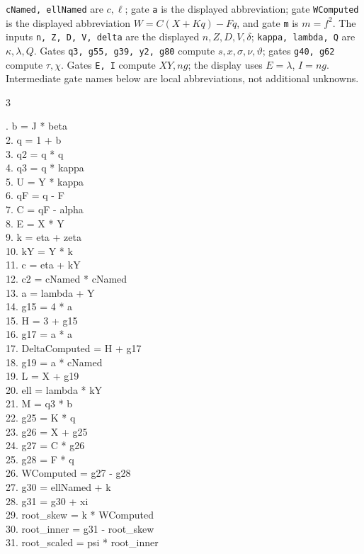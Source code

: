 \documentclass[10pt]{article}
\begin{document}
\texttt{cNamed, ellNamed} are $c,\ell$; gate \texttt{a} is the displayed abbreviation; gate \texttt{WComputed} is the displayed abbreviation $W=C(X+Kq)-Fq$, and gate \texttt{m} is $m=f^2$. The inputs
\texttt{n, Z, D, V, delta} are the displayed
$n,Z,D,V,\delta$; \texttt{kappa, lambda, Q}
are $\kappa,\lambda,Q$. Gates \texttt{q3, g55, g39, y2, g80} compute $s,x,\sigma,\nu,\vartheta$; gates \texttt{g40, g62} compute $\tau,\chi$. Gates \texttt{E, I} compute
$XY,ng$; the display uses $E=\lambda$, $I=ng$. Intermediate gate
names below are local abbreviations, not additional unknowns.
\begin{multicols}{3}
\raggedright\ttfamily\fontsize{7.2}{8.4}. b = J * beta\\
2. q = 1 + b\\
3. q2 = q * q\\
4. q3 = q * kappa\\
5. U = Y * kappa\\
6. qF = q - F\\
7. C = qF - alpha\\
8. E = X * Y\\
9. k = eta + zeta\\
10. kY = Y * k\\
11. c = eta + kY\\
12. c2 = cNamed * cNamed\\
13. a = lambda + Y\\
14. g15 = 4 * a\\
15. H = 3 + g15\\
16. g17 = a * a\\
17. DeltaComputed = H + g17\\
18. g19 = a * cNamed\\
19. L = X + g19\\
20. ell = lambda * kY\\
21. M = q3 * b\\
22. g25 = K * q\\
23. g26 = X + g25\\
24. g27 = C * g26\\
25. g28 = F * q\\
26. WComputed = g27 - g28\\
27. g30 = ellNamed + k\\
28. g31 = g30 + xi\\
29. root\_skew = k * WComputed\\
30. root\_inner = g31 - root\_skew\\
31. root\_scaled = psi * root\_inner\\

\end{multicols}
\end{document}
